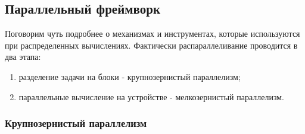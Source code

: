 \documentclass[a4paper, 14pt]{extarticle}
\theoremstyle{definition}
\begin{document}

\subsection{Параллельный фреймворк}


\par Поговорим чуть подробнее о механизмах и инструментах, которые используются при распределенных вычислениях. Фактически распараллеливание проводится в два этапа:
\begin{enumerate}
\item разделение задачи на блоки - крупнозернистый параллелизм;
\item параллельные вычисление на устройстве - мелкозернистый параллелизм.
\end{enumerate}

\subsubsection{Крупнозернистый параллелизм}
\end{document}
